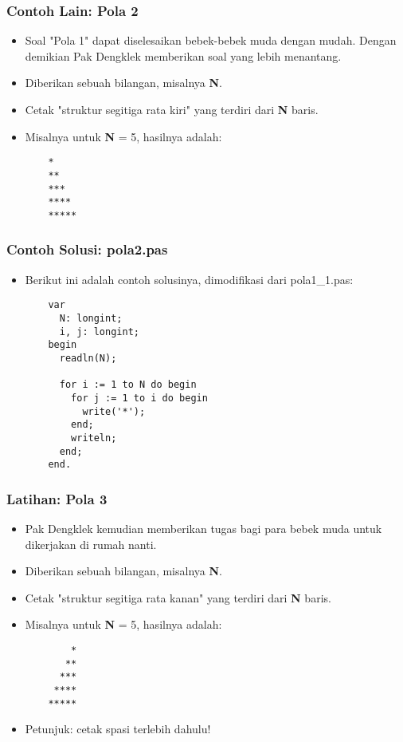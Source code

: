\begin{frame}[fragile]
\frametitle{Contoh Lain: Pola 2}
\begin{itemize}
  \item Soal "Pola 1" dapat diselesaikan bebek-bebek muda dengan mudah. Dengan demikian Pak Dengklek memberikan soal yang lebih menantang.
  \item Diberikan sebuah bilangan, misalnya \textbf{N}.
  \item Cetak "struktur segitiga rata kiri" yang terdiri dari \textbf{N} baris.
  \item Misalnya untuk \textbf{N} = 5, hasilnya adalah:
  \begin{lstlisting}
    *
    **
    ***
    ****
    *****
  \end{lstlisting}
\end{itemize}
\end{frame}

\begin{frame}[fragile]
\frametitle{Contoh Solusi: pola2.pas}
\begin{itemize}
  \item Berikut ini adalah contoh solusinya, dimodifikasi dari pola1\_1.pas:
  \begin{lstlisting}
    var
      N: longint;
      i, j: longint;
    begin
      readln(N);

      for i := 1 to N do begin
        for j := 1 to i do begin
          write('*');
        end;
        writeln;
      end;
    end.
  \end{lstlisting}
\end{itemize}
\end{frame}

\begin{frame}[fragile]
\frametitle{Latihan: Pola 3}
\begin{itemize}
  \item Pak Dengklek kemudian memberikan tugas bagi para bebek muda untuk dikerjakan di rumah nanti.
  \item Diberikan sebuah bilangan, misalnya \textbf{N}.
  \item Cetak "struktur segitiga rata kanan" yang terdiri dari \textbf{N} baris.
  \item Misalnya untuk \textbf{N} = 5, hasilnya adalah:
  \begin{lstlisting}
        *
       **
      ***
     ****
    *****
  \end{lstlisting}
  \item Petunjuk: cetak spasi terlebih dahulu!
\end{itemize}
\end{frame}

